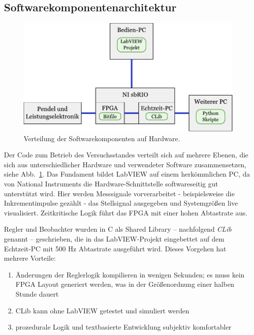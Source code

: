 \documentclass[a4paper,10pt]{scrartcl}
\begin{document}
\subsection{Softwarekomponentenarchitektur }

\begin{figure}[ht]
    \begin{center}
    \includegraphics[width=.8\textwidth]{img/pendel_hw_sw}
    \end{center}
    \caption{Verteilung der Softwarekomponenten auf Hardware.}
    \label{fig_hw_sw}
\end{figure}

Der Code zum Betrieb des Versuchsstandes verteilt sich auf mehrere Ebenen, die sich aus unterschiedlicher Hardware und verwendeter Software zusammensetzen, siehe Abb.~\ref{fig_hw_sw}. Das Fundament bildet LabVIEW auf einem herkömmlichen PC, da von National Instruments die Hardware-Schnittstelle softwareseitig gut unterstützt wird. Hier werden Messsignale vorverarbeitet - beispielsweise die Inkrementimpulse gezählt - das Stellsignal ausgegeben und Systemgrößen live visualisiert. Zeitkritische Logik führt das FPGA mit einer hohen Abtastrate aus.

Regler und Beobachter wurden in C als Shared Library -- nachfolgend \emph{CLib} genannt -- geschrieben, die in das LabVIEW-Projekt eingebettet auf dem Echtzeit-PC mit 500 Hz Abtastrate ausgeführt wird. Dieses Vorgehen hat mehrere Vorteile:

\begin{enumerate}
    \item Änderungen der Reglerlogik kompilieren in wenigen Sekunden; es muss kein FPGA Layout generiert werden, was in der Größenordnung einer halben Stunde dauert
    \item CLib kann ohne LabVIEW getestet und simuliert werden
    \item prozedurale Logik und textbasierte Entwicklung subjektiv komfortabler
\end{enumerate}
\end{document}
